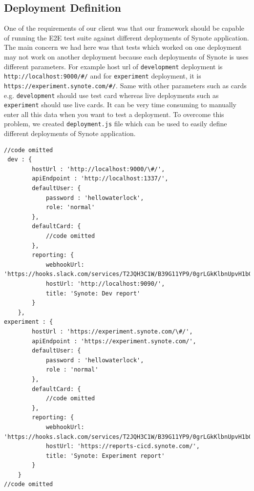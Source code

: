 \subsection{Deployment Definition}
\label{subsec:deployment-definition}
One of the requirements of our client was that our framework should be capable of running the E2E test suite against different deployments of Synote application. The main concern we had here was that tests which worked on one deployment may not work on another deployment because each deployments of Synote is uses different parameters. For example host url of \texttt{development} deployment is \texttt{http://localhost:9000/\#/} and for  \texttt{experiment} deployment, it is \texttt{https://experiment.synote.com/\#/}. Same with other parameters such as cards e.g. \texttt{development} should use test card whereas live deployments such as \texttt{experiment} should use live cards. It can be very time consuming to manually enter all this data when you want to test a deployment. To overcome this problem, we created \texttt{deployment.js} file which can be used to easily define different deployments of Synote application.

\begin{listing}[H]
\begin{verbatim}
//code omitted
 dev : {
        hostUrl : 'http://localhost:9000/\#/',
        apiEndpoint : 'http://localhost:1337/',
        defaultUser: {
            password : 'hellowaterlock',
            role: 'normal'
        },
        defaultCard: {
            //code omitted
        },
        reporting: {
            webhookUrl: 'https://hooks.slack.com/services/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',
            hostUrl: 'http://localhost:9090/',
            title: 'Synote: Dev report'
        }
    },
experiment : {
        hostUrl : 'https://experiment.synote.com/\#/',
        apiEndpoint : 'https://experiment.synote.com/',
        defaultUser: {
            password : 'hellowaterlock',
            role : 'normal'
        },
        defaultCard: {
            //code omitted
        },
        reporting: {
            webhookUrl: 'https://hooks.slack.com/services/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',
            hostUrl: 'https://reports-cicd.synote.com/',
            title: 'Synote: Experiment report'
        }
    }    
//code omitted
\end{verbatim}
\label{lst:deployment-file}
\end{listing}

